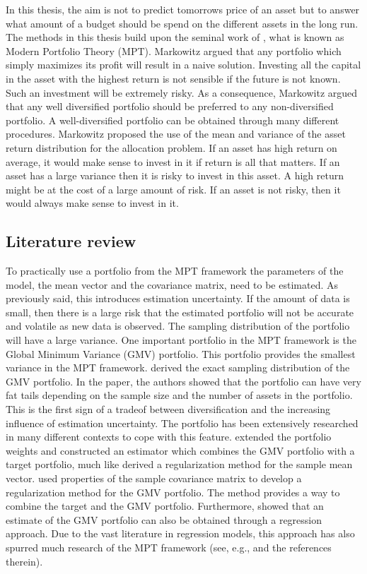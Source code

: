 In this thesis, the aim is not to predict tomorrows price of an asset but to answer what amount of a budget should be spend on the different assets in the long run.
The methods in this thesis build upon the seminal work of \citet{markowitz1959portfolio}, what is known as Modern Portfolio Theory (MPT).
Markowitz argued that any portfolio which simply maximizes its profit will result in a naive solution.
Investing all the capital in the asset with the highest return is not sensible if the future is not known.
Such an investment will be extremely risky. 
As a consequence, Markowitz argued that any well diversified portfolio should be preferred to any non-diversified portfolio. 
A well-diversified portfolio can be obtained through many different procedures.
Markowitz proposed the use of the mean and variance of the asset return distribution for the allocation problem.
If an asset has high return on average, it would make sense to invest in it if return is all that matters.
If an asset has a large variance then it is risky to invest in this asset. 
A high return might be at the cost of a large amount of risk.
If an asset is not risky, then it would always make sense to invest in it.

\subsection{Literature review}
To practically use a portfolio from the MPT framework the parameters of the model, the mean vector and the covariance matrix, need to be estimated.
As previously said, this introduces estimation uncertainty.
If the amount of data is small, then there is a large risk that the estimated portfolio will not be accurate and volatile as new data is observed.
The sampling distribution of the portfolio will have a large variance.
One important portfolio in the MPT framework is the Global Minimum Variance (GMV) portfolio.
This portfolio provides the smallest variance in the MPT framework.
\citet{okhrin2006distributional} derived the exact sampling distribution of the GMV portfolio. 
In the paper, the authors showed that the portfolio can have very fat tails depending on the sample size and the number of assets in the portfolio.
This is the first sign of a tradeof between diversification and the increasing influence of estimation uncertainty.
The portfolio has been extensively researched in many different contexts to cope with this feature.
\citet{frahm2010} extended the portfolio weights and constructed an estimator which combines the GMV portfolio with a target portfolio, much like \citet{stein1956} derived a regularization method for the sample mean vector. 
\citet{frahm2010} used properties of the sample covariance matrix to develop a regularization method for the GMV portfolio.
The method provides a way to combine the target and the GMV portfolio.
Furthermore, \citet{kempf2006estimating} showed that an estimate of the GMV portfolio can also be obtained through a regression approach.
Due to the vast literature in regression models, this approach has also spurred much research of the MPT framework (see, e.g., \citet{maillet2015global} and the references therein).

